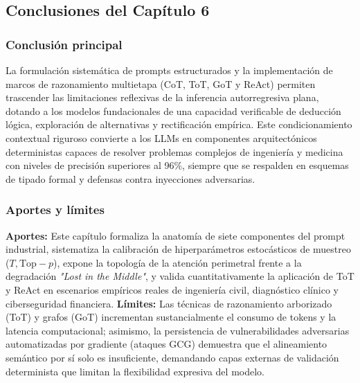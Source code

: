 \subsection*{Conclusiones del Capítulo 6}

\subsubsection*{Conclusión principal}
La formulación sistemática de prompts estructurados y la implementación de marcos de razonamiento multietapa (CoT, ToT, GoT y ReAct) permiten trascender las limitaciones reflexivas de la inferencia autorregresiva plana, dotando a los modelos fundacionales de una capacidad verificable de deducción lógica, exploración de alternativas y rectificación empírica. Este condicionamiento contextual riguroso convierte a los LLMs en componentes arquitectónicos deterministas capaces de resolver problemas complejos de ingeniería y medicina con niveles de precisión superiores al 96\%, siempre que se respalden en esquemas de tipado formal y defensas contra inyecciones adversarias.

\subsubsection*{Aportes y límites}
\textbf{Aportes:} Este capítulo formaliza la anatomía de siete componentes del prompt industrial, sistematiza la calibración de hiperparámetros estocásticos de muestreo ($T, \mathrm{Top-}p$), expone la topología de la atención perimetral frente a la degradación \textit{"Lost in the Middle"}, y valida cuantitativamente la aplicación de ToT y ReAct en escenarios empíricos reales de ingeniería civil, diagnóstico clínico y ciberseguridad financiera. \textbf{Límites:} Las técnicas de razonamiento arborizado (ToT) y grafos (GoT) incrementan sustancialmente el consumo de tokens y la latencia computacional; asimismo, la persistencia de vulnerabilidades adversarias automatizadas por gradiente (ataques GCG) demuestra que el alineamiento semántico por sí solo es insuficiente, demandando capas externas de validación determinista que limitan la flexibilidad expresiva del modelo.


